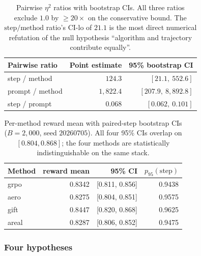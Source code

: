 \begin{table}[htbp]
\centering
\small
\begin{tabular}{lrr}
\toprule
\textbf{Pairwise ratio} & \textbf{Point estimate} & 95\% bootstrap CI \\
\midrule
step / method     & $124.3$ & $[21.1,\ 552.6]$ \\
prompt / method   & $1{,}822.4$ & $[207.9,\ 8{,}892.8]$ \\
step / prompt     & $0.068$ & $[0.062,\ 0.101]$ \\
\bottomrule
\end{tabular}
\caption{Pairwise $\eta^2$ ratios with bootstrap CIs. All three ratios
exclude $1.0$ by $\geq 20\times$ on the conservative bound. The
$\text{step}/\text{method}$ ratio's CI-lo of $21.1$ is the most
direct numerical refutation of the null hypothesis ``algorithm and
trajectory contribute equally''.}
\label{tab:p5-iter141-ratios}
\end{table}

\begin{table}[htbp]
\centering
\small
\begin{tabular}{lrrr}
\toprule
\textbf{Method} & \textbf{reward mean} & 95\% CI & $p_{95}(\text{step})$ \\
\midrule
grpo  & 0.8342 & [0.811, 0.856] & 0.9438 \\
aero  & 0.8275 & [0.804, 0.851] & 0.9575 \\
gift  & 0.8447 & [0.820, 0.868] & 0.9625 \\
areal & 0.8287 & [0.806, 0.852] & 0.9475 \\
\bottomrule
\end{tabular}
\caption{Per-method reward mean with paired-step bootstrap CIs
($B = 2{,}000$, seed $20260705$). All four 95\% CIs overlap on
$[0.804, 0.868]$; the four methods are statistically indistinguishable
on the same stack.}
\label{tab:p5-iter141-method-reward}
\end{table}

\subsubsection{Four hypotheses}

